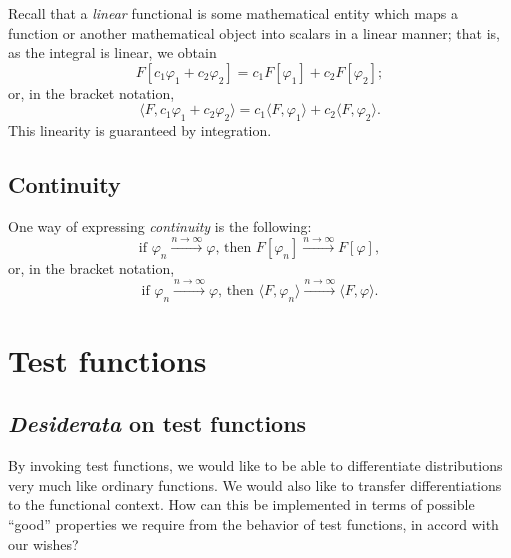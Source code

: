 Recall that a {\em linear} functional is some mathematical entity which maps a function or another mathematical object
into scalars in a linear manner; that is, as the integral is linear, we obtain
\begin{equation}
F[c_1\varphi_1+c_2\varphi_2 ]=
c_1F[\varphi_1]  +
c_2F[\varphi_2];
\end{equation}
or, in the bracket notation,
\begin{equation}
\langle F ,   c_1\varphi_1+c_2\varphi_2 \rangle  =
c_1 \langle F ,  \varphi_1   \rangle  +
c_2 \langle F ,   \varphi_2   \rangle .
\end{equation}
This linearity is guaranteed by integration.

\subsection{Continuity}

One way of expressing {\em continuity} is
 the following:
\begin{equation}
\textrm{if }
\varphi_n \stackrel{n\rightarrow \infty}{\longrightarrow} \varphi
\textrm{, then }
F[\varphi_n ] \stackrel{n\rightarrow \infty}{\longrightarrow} F[\varphi  ],
\end{equation}
or, in the bracket notation,
\begin{equation}
\textrm{if }
\varphi_n \stackrel{n\rightarrow \infty}{\longrightarrow} \varphi
\textrm{, then }
\langle F ,    \varphi_n  \rangle \stackrel{n\rightarrow \infty}{\longrightarrow} \langle F ,    \varphi   \rangle .
\end{equation}


\section{Test functions}

\subsection{{\it Desiderata} on test functions}

By invoking test functions, we would like to be able to differentiate distributions very much like ordinary functions.
We would also like to transfer differentiations to the functional context.
How can this be implemented in terms of possible ``good'' properties we require from the behavior of test functions, in accord with our wishes?

